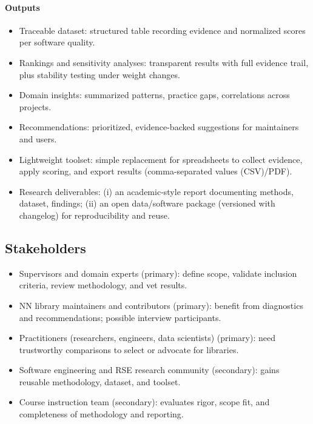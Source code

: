 \documentclass{article}
\begin{document}
\paragraph{Outputs}
\begin{itemize}
  \item Traceable dataset: structured table recording evidence and normalized
  scores per software quality.
  \item Rankings and sensitivity analyses: transparent results with full evidence trail,
  plus stability testing under weight changes.
  \item Domain insights: summarized patterns, practice gaps, correlations across projects.
  \item Recommendations: prioritized, evidence-backed suggestions for maintainers and users.
  \item Lightweight toolset: simple replacement for spreadsheets to collect evidence,
  apply scoring, and export results (comma-separated values (CSV)/PDF).
  \item Research deliverables: (i) an academic-style report documenting methods,
  dataset, findings; (ii) an open data/software package (versioned with changelog)
  for reproducibility and reuse.
\end{itemize}


\subsection{Stakeholders}
\begin{itemize}
  \item Supervisors and domain experts (primary): define scope, validate inclusion criteria,
  review methodology, and vet results.
  \item NN library maintainers and contributors (primary): benefit from diagnostics
  and recommendations; possible interview participants.
  \item Practitioners (researchers, engineers, data scientists) (primary): need trustworthy
  comparisons to select or advocate for libraries.
  \item Software engineering and RSE research community (secondary): gains reusable
  methodology, dataset, and toolset.
  \item Course instruction team (secondary): evaluates rigor, scope fit, and completeness
  of methodology and reporting.
\end{itemize}
\end{document}
